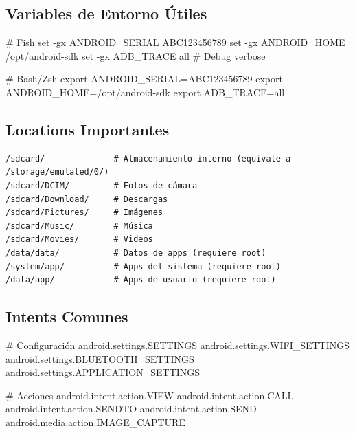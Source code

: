 \documentclass[
  doc,
  floatsintext,
  longtable,
  a4paper,
  nolmodern,
  notxfonts,
  notimes,
  12pt,
  colorlinks=true,linkcolor=blue,citecolor=blue,urlcolor=blue]{apa7}
\newenvironment{Shaded}{\begin{snugshade}}{\end{snugshade}}
\newcommand{\CommentTok}[1]{\textcolor[rgb]{0.37,0.37,0.37}{#1}}
\newcommand{\ExtensionTok}[1]{\textcolor[rgb]{0.00,0.23,0.31}{#1}}
\newcommand{\NormalTok}[1]{\textcolor[rgb]{0.00,0.23,0.31}{#1}}
\begin{document}
\subsection{Variables de Entorno
Útiles}\label{variables-de-entorno-uxfatiles}

\begin{Shaded}
\begin{Highlighting}[]
\NormalTok{\# Fish}
\NormalTok{set {-}gx ANDROID\_SERIAL ABC123456789}
\NormalTok{set {-}gx ANDROID\_HOME /opt/android{-}sdk}
\NormalTok{set {-}gx ADB\_TRACE all  \# Debug verbose}

\NormalTok{\# Bash/Zsh}
\NormalTok{export ANDROID\_SERIAL=ABC123456789}
\NormalTok{export ANDROID\_HOME=/opt/android{-}sdk}
\NormalTok{export ADB\_TRACE=all}
\end{Highlighting}
\end{Shaded}

\subsection{Locations Importantes}\label{locations-importantes}

\begin{verbatim}
/sdcard/              # Almacenamiento interno (equivale a /storage/emulated/0/)
/sdcard/DCIM/         # Fotos de cámara
/sdcard/Download/     # Descargas
/sdcard/Pictures/     # Imágenes
/sdcard/Music/        # Música
/sdcard/Movies/       # Videos
/data/data/           # Datos de apps (requiere root)
/system/app/          # Apps del sistema (requiere root)
/data/app/            # Apps de usuario (requiere root)
\end{verbatim}

\subsection{Intents Comunes}\label{intents-comunes}

\begin{Shaded}
\begin{Highlighting}[]
\CommentTok{\# Configuración}
\ExtensionTok{android.settings.SETTINGS}
\ExtensionTok{android.settings.WIFI\_SETTINGS}
\ExtensionTok{android.settings.BLUETOOTH\_SETTINGS}
\ExtensionTok{android.settings.APPLICATION\_SETTINGS}

\CommentTok{\# Acciones}
\ExtensionTok{android.intent.action.VIEW}
\ExtensionTok{android.intent.action.CALL}
\ExtensionTok{android.intent.action.SENDTO}
\ExtensionTok{android.intent.action.SEND}
\ExtensionTok{android.media.action.IMAGE\_CAPTURE}
\end{Highlighting}
\end{Shaded}
\end{document}
